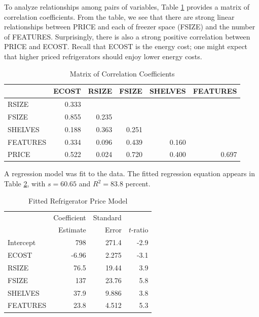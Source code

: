 To analyze relationships among pairs of variables, Table
\ref{T3:RefrigCorr} provides a matrix of correlation coefficients.
From the table, we see that there are strong linear relationships
between PRICE and each of freezer space (FSIZE) and the number of
FEATURES. Surprisingly, there is also a strong positive correlation
between PRICE and ECOST. Recall that ECOST is the energy cost; one
might expect that higher priced refrigerators should enjoy lower
energy costs.

\begin{table}[h]
\caption{\label{T3:RefrigCorr} Matrix of Correlation Coefficients}
\begin{center}
\begin{tabular}{lrrrrr}
\hline
 & ECOST & RSIZE & FSIZE & SHELVES & FEATURES
\\ \hline
RSIZE & \multicolumn{1}{|r}{0.333} &  &  &  &  \\
FSIZE & \multicolumn{1}{|r}{0.855} & 0.235 &  &  &  \\
SHELVES & \multicolumn{1}{|r}{0.188} & 0.363 & 0.251 &  &  \\
FEATURES & \multicolumn{1}{|r}{0.334} & 0.096 & 0.439 & 0.160 &  \\
PRICE & \multicolumn{1}{|r}{0.522} & 0.024 & 0.720 & 0.400 & 0.697 \\ \hline
\end{tabular}\end{center}\end{table}

A regression model was fit to the data. The fitted regression
equation appears in Table \ref{T3:RefrigFittedModel}, with $s=60.65$
and $R^2=83.8$ percent.


\begin{table}[h]\begin{center}
\caption{\label{T3:RefrigFittedModel} Fitted Refrigerator Price
Model} 
\begin{tabular}{lrrr}
  \hline
       &  Coefficient & Standard \\
        & Estimate    & Error & $t$-ratio \\  \hline
Intercept & 798 & 271.4 & -2.9 \\
ECOST    & -6.96 & 2.275 & -3.1 \\
RSIZE    & 76.5 & 19.44 & 3.9 \\
FSIZE    & 137 & 23.76 & 5.8 \\
SHELVES  & 37.9 & 9.886 & 3.8 \\
FEATURES & 23.8 &  4.512 & 5.3\\
  \hline
\end{tabular}
\end{center}\end{table}


